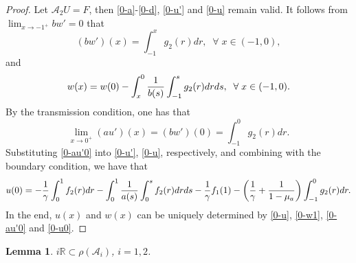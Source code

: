 \documentclass[twoside]{article}
\newtheorem{lemma}[definition]{Lemma}
\theoremstyle{noparens}
\theoremstyle{definition}
\numberwithin{equation}{section}
\numberwithin{figure}{section}
\begin{document}
\begin{proof}
Let $\mathcal A_2 U= F$, then \eqref{0-a}-\eqref{0-d}, \eqref{0-u'} and \eqref{0-u} remain valid. It follows from $\lim_{x\rightarrow -1^+} bw'= 0$ that
\begin{equation}
	(bw')(x) = \int_{-1}^x g_2(r)dr,\;\;\forall\;x\in(-1,0),
\end{equation}
and
\begin{equation}\label{0-w1}
	w(x) = w(0) - \int_x^0{1\over b(s)}\int_{-1}^s g_2(r) drds,\;\;\forall\;x\in(-1,0).
\end{equation}
By the transmission condition, one has that
\begin{equation}\label{0-au'0}
	\lim_{x\to0^+}(au')(x) = (bw')(0) = \int_{-1}^0 g_2(r)dr.
\end{equation}
Substituting \eqref{0-au'0} into \eqref{0-u'}, \eqref{0-u}, respectively, and combining with the boundary condition, we have that
\begin{equation}\label{0-u0}
	\begin{split}
		u(0) = -{1\over\gamma} \int_0^1 f_2(r)dr - \int_0^1 {1\over a(s)}\int_0^s f_2(r)dr ds
		- {1\over\gamma} f_1(1)-\left({1\over\gamma} + {1\over1-\mu_a}\right)\int_{-1}^0 g_2(r)dr.
	\end{split}
\end{equation}
In the end, $u(x)$ and $w(x)$ can be  uniquely determined by \eqref{0-u}, \eqref{0-w1}, \eqref{0-au'0} and \eqref{0-u0}.
\end{proof}
\begin{lemma}
$i\mathbb R\subset \rho(\mathcal A_i)$, $i=1,2$.
\end{lemma}
\end{document}
